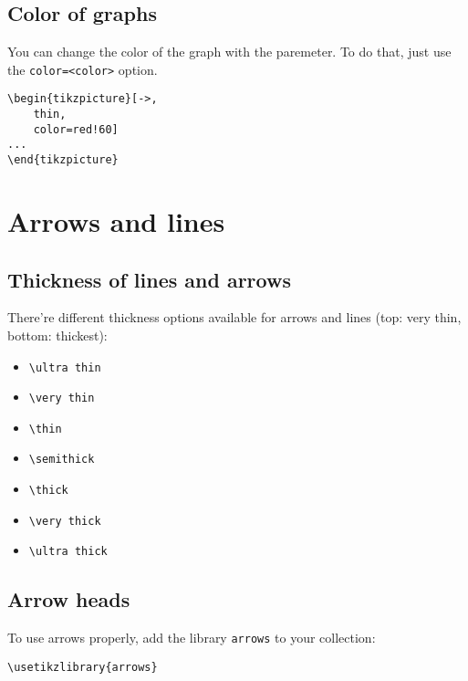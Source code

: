 \documentclass[../../../include/open-logic-chapter]{subfiles}
\begin{document}
	\subsection{Color of graphs}
		You can change the color of the graph with the paremeter. To do that, just use the \texttt{color=<color>} option.\\

			\begin{lstlisting}[caption={Choosing a slight red color (60\% red, 40\% white/background)}]
\begin{tikzpicture}[->,
	thin,
	color=red!60]
...
\end{tikzpicture}
			\end{lstlisting}

	\section{Arrows and lines}
	\subsection{Thickness of lines and arrows}
		There're different thickness options available for arrows and lines (top: very thin, bottom: thickest):
		\begin{itemize}
			\item \texttt{\textbackslash ultra thin}
			\item \texttt{\textbackslash very thin}
			\item \texttt{\textbackslash thin}
			\item \texttt{\textbackslash semithick}
			\item \texttt{\textbackslash thick}
			\item \texttt{\textbackslash very thick}
			\item \texttt{\textbackslash ultra thick}
		\end{itemize}
	\subsection{Arrow heads}
		To use arrows properly, add the  library \texttt{arrows} to your collection:\\

			\begin{lstlisting}[caption={The library \texttt{arrows} is used to draw arrows.}]
\usetikzlibrary{arrows}
			\end{lstlisting}
\end{document}

